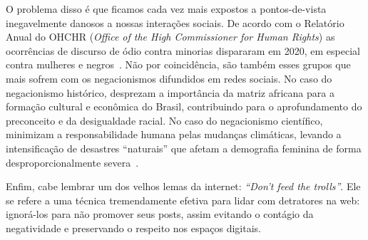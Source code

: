 \documentclass[
    report,
    11pt,
    oneside,
    a4paper,
    english,
    brazil,
    sumario=tradicional
    ]{abntex2}
\begin{document}
    O problema disso é que ficamos cada vez mais expostos a pontos-de-vista inegavelmente danosos a nossas interações sociais. De acordo com o Relatório Anual do OHCHR (\textit{Office of the High Commissioner for Human Rights}) as ocorrências de discurso de ódio contra minorias dispararam em 2020, em especial contra mulheres e negros~\cite{hate-speech-increasing}. Não por coincidência, são também esses grupos que mais sofrem com os negacionismos difundidos em redes sociais. No caso do negacionismo histórico, desprezam a importância da matriz africana para a formação cultural e econômica do Brasil, contribuindo para o aprofundamento do preconceito e da desigualdade racial. No caso do negacionismo científico, minimizam a responsabilidade humana pelas mudanças climáticas, levando a intensificação de desastres ``naturais'' que afetam a demografia feminina de forma desproporcionalmente severa~\cite{clima-mulheres}.

    Enfim, cabe lembrar um dos velhos lemas da internet: \textit{``Don't feed the trolls''}. Ele se refere a uma técnica tremendamente efetiva para lidar com detratores na web: ignorá-los para não promover seus posts, assim evitando o contágio da negatividade e preservando o respeito nos espaços digitais.


\nocite{manipulation-for-science, be-mean-online}

\pagebreak

\postextual


\end{document}
